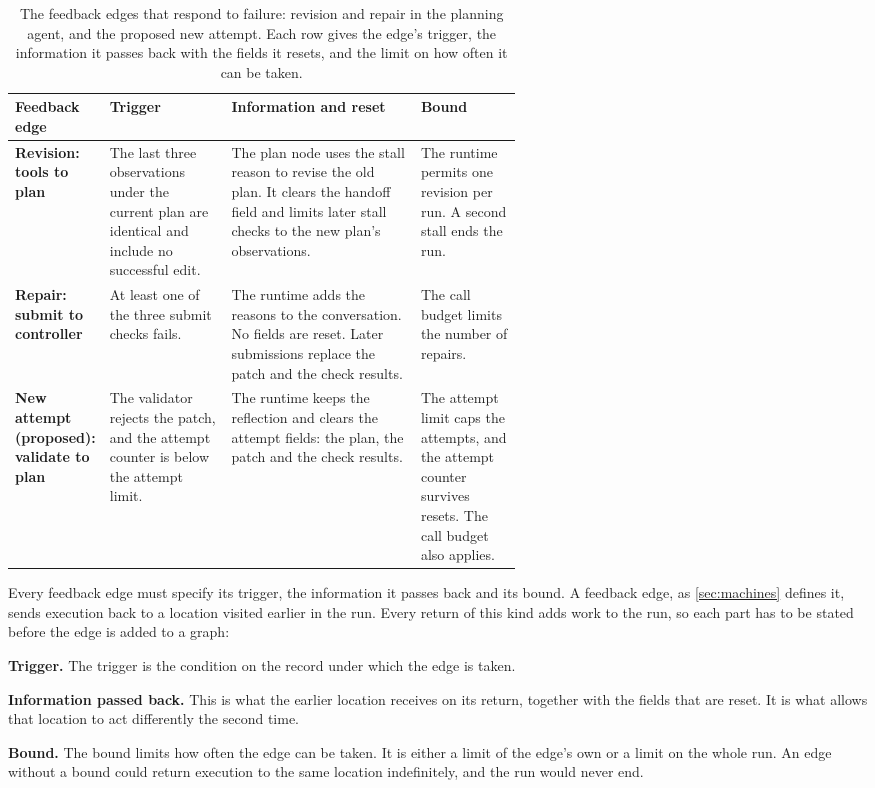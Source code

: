 \begin{table}[t]
  \caption{The feedback edges that respond to failure: revision and repair in the planning agent,
  and the proposed new attempt. Each row gives the edge's trigger, the information it passes back
  with the fields it resets, and the limit on how often it can be taken.}
  \label{tab:routing-feedback}
  \begin{adjustbox}{width=\linewidth}\begin{tabularx}{\linewidth}{L{0.15\linewidth}L{0.24\linewidth}XL{0.2\linewidth}}
    \toprule
    \textbf{Feedback edge} & \textbf{Trigger} & \textbf{Information and reset} & \textbf{Bound} \\
    \midrule
    \textbf{Revision: tools to plan} & The last three observations under the current plan are
    identical and include no successful edit. & The plan node uses the stall reason to revise the
    old plan. It clears the handoff field and limits later stall checks to the new plan's
    observations. & The runtime permits one revision per run. A second stall ends the run. \\
    \addlinespace
    \textbf{Repair: submit to controller} & At least one of the three submit checks fails. & The
    runtime adds the reasons to the conversation. No fields are reset. Later submissions replace the
    patch and the check results. & The call budget limits the number of repairs. \\
    \addlinespace
    \textbf{New attempt (proposed): validate to plan} & The validator rejects the patch, and the
    attempt counter is below the attempt limit. & The runtime keeps the reflection and clears the
    attempt fields: the plan, the patch and the check results. & The attempt limit caps the
    attempts, and the attempt counter survives resets. The call budget also applies. \\
    \bottomrule
  \end{tabularx}\end{adjustbox}
\end{table}

Every feedback edge must specify its trigger, the information it passes back and its bound. A
feedback edge, as \cref{sec:machines} defines it, sends execution back to a location visited earlier
in the run. Every return of this kind adds work to the run, so each part has to be stated before the
edge is added to a graph:
\bi
\item \textbf{Trigger.} The trigger is the condition on the record under which the edge is taken.
\item \textbf{Information passed back.} This is what the earlier location receives on its return,
together with the fields that are reset. It is what allows that location to act differently the
second time.
\item \textbf{Bound.} The bound limits how often the edge can be taken. It is either a limit of the
edge's own or a limit on the whole run.
\ei
An edge without a bound could return execution to the same location indefinitely, and the run would
never end.

